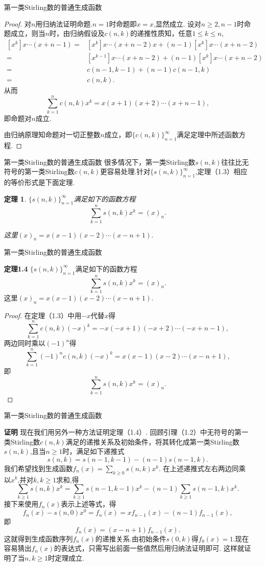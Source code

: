 \documentclass[punct]{ctexbeamer}
\newtheorem{thm}{定理}[section]
\begin{document}
\begin{frame}{第一类Stirling数的普通生成函数}
\begin{proof}
	对$n$用归纳法证明命题.$n=1$时命题即$x=x$,显然成立.
	设对$n \geq 2,n-1$时命题成立，则当$n$时，由归纳假设及$c(n,k)$的递推性质知，任意$1\leq k\leq n$,	
	\[\begin{aligned}
	[x^k]x\cdots(x+n-1)
	=&[x^k]x\cdots(x+n-2)x+(n-1)[x^k]x\cdots(x+n-2)\\
	=&[x^{k-1}]x\cdots(x+n-2)+(n-1)[x^k]x\cdots(x+n-2)\\
	=&c(n-1,k-1)+(n-1)c(n-1,k)\\
	=&c(n,k).
	\end{aligned}
	\]从而
	$$\sum_{k=1}^n{c(n,k)x^k}=x(x+1)(x+2)\cdots(x+n-1),$$
	即命题对$n$成立.

	由归纳原理知命题对一切正整数$n$成立，即$\{c(n,k)\}_{n=1}^{\infty}$满足定理中所述函数方程.
\end{proof}
\end{frame}		



\begin{frame}{第一类Stirling数的普通生成函数}
很多情况下，第一类Stirling数$s(n,k)$往往比无符号的第一类Stirling数$c(n,k)$更容易处理.针对$\{s(n,k)\}_{n=1}^{\infty}$,定理（1.3）相应的等价形式是下面定理.
\begin{thm}
	$\{s(n,k)\}_{n=1}^{\infty}$满足如下的函数方程
	$$\sum_{k=1}^n{s(n,k)x^k}=(x)_n.$$
	
	这里$(x)_n=x(x-1)(x-2)\cdots(x-n+1).$
\end{thm}
\end{frame}	
\begin{frame}{第一类Stirling数的普通生成函数}
	
	{\bf 定理1.4}
		$\{s(n,k)\}_{n=1}^{\infty}$满足如下的函数方程
		$$\sum_{k=1}^n{s(n,k)x^k}=(x)_n.$$
	这里$(x)_n=x(x-1)(x-2)\cdots(x-n+1).$
    \begin{proof}
	在定理（1.3）中用$-x$代替$x$得
	$$\sum_{k=1}^n{c(n,k)(-x)^k}=-x(-x+1)(-x+2)\cdots(-x+n-1),$$
	两边同时乘以$(-1)^n$得
	$$\sum_{k=1}^n{(-1)^nc(n,k)(-x)^k}=x(x-1)(x-2)\cdots(x-n+1),$$
	即$$\sum_{k=1}^n{s(n,k)x^k}=(x)_n.$$
    \end{proof}
\end{frame}
\begin{frame}{第一类Stirling数的普通生成函数}

{\bf 证明}
   		现在我们用另外一种方法证明定理（1.4）.
   		回顾引理（1.2）中无符号的第一类Stirling数$c(n,k)$满足的递推关系及初始条件，将其转化成第一类Stirling数$s(n,k)$,且当$n\ge 1$时，满足如下递推式
   		$$s(n,k)=s(n-1,k-1)-(n-1)s(n-1,k).$$
   		我们希望找到生成函数$f_n(x)=\sum_{k\ge 0}{s(n,k)x^k}.$
   		在上述递推式左右两边同乘以$x^k$,并对$k,k\ge 1$求和,得
   		   	$$\sum_{k\ge 1}{s(n,k)x^k}=\sum_{k\ge 1}{s(n-1,k-1)x^k}-(n-1)\sum_{k\ge 1}{s(n-1,k)x^k}.$$
   		 接下来使用$f_n(x)$表示上述等式，得
   		 $$f_n(x)-s(n,0)x^0=f_n(x)=xf_{n-1}(x)-(n-1)f_{n-1}(x),$$
   		 即
   		 $$f_n(x)=(x-n+1)f_{n-1}(x).$$
   		 这就得到生成函数序列$f_n(x)$的递推关系.由初始条件$s(0,k)$得$f_0(x)=1$.现在容易猜出$f_n(x)$的表达式，只需写出前面一些值然后用归纳法证明即可.
   		这样就证明了当$n,k\ge 1$时定理成立.

\end{frame}
\end{document}
